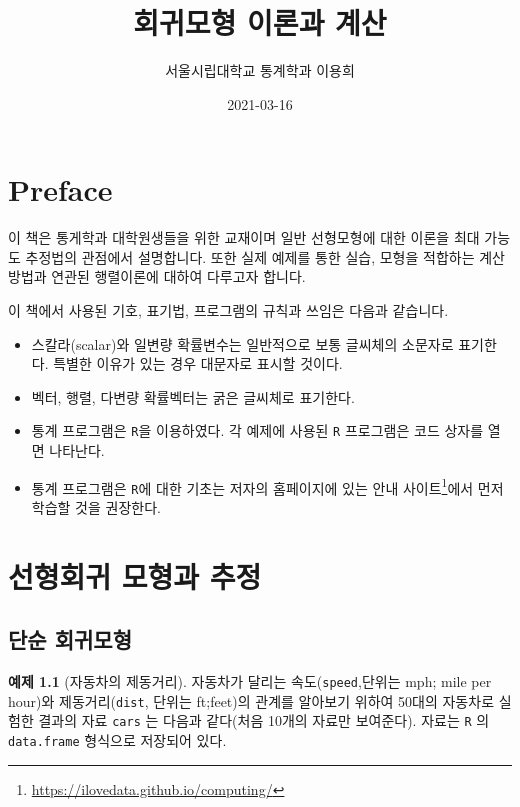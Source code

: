\documentclass[
]{book}
\title{회귀모형 이론과 계산}
\author{서울시립대학교 통계학과 이용희}
\date{2021-03-16}
\makeatletter
\providecommand{\tightlist}{%
  \setlength{\itemsep}{0pt}\setlength{\parskip}{0pt}}
\renewcommand{\href}[2]{#2\footnote{\url{#1}}}
\newenvironment{kframe}{%
\medskip{}
\setlength{\fboxsep}{.8em}
 \def\at@end@of@kframe{}%
 \ifinner\ifhmode%
  \def\at@end@of@kframe{\end{minipage}}%
  \begin{minipage}{\columnwidth}%
 \fi\fi%
 \def\FrameCommand##1{\hskip\@totalleftmargin \hskip-\fboxsep
 \colorbox{shadecolor}{##1}\hskip-\fboxsep
     \hskip-\linewidth \hskip-\@totalleftmargin \hskip\columnwidth}%
 \MakeFramed {\advance\hsize-\width
   \@totalleftmargin\z@ \linewidth\hsize
   \@setminipage}}%
 {\par\unskip\endMakeFramed%
 \at@end@of@kframe}
\newenvironment{rmdblock}[1]
  {
  \begin{itemize}
  \renewcommand{\labelitemi}{
    \raisebox{-.7\height}[0pt][0pt]{
      {\setkeys{Gin}{width=3em,keepaspectratio}\texttt{[image: images/\#1]}}
    }
  }
  \setlength{\fboxsep}{1em}
  \begin{kframe}
  \item
  }
  {
  \end{kframe}
  \end{itemize}
  }
\newenvironment{rmdimportant}
  {\begin{rmdblock}{important}}
  {\end{rmdblock}}
\theoremstyle{definition}
\theoremstyle{definition}
\newtheorem{example}{예제}[chapter]
\theoremstyle{definition}
\theoremstyle{remark}
\makeatother
\begin{document}
\maketitle

{
\setcounter{tocdepth}{1}
\tableofcontents
}
\hypertarget{preface}{%
\chapter*{Preface}\label{preface}}


이 책은 통게학과 대학원생들을 위한 교재이며 일반 선형모형에 대한 이론을 최대 가능도 추정법의 관점에서 설명합니다. 또한 실제 예제를 통한 실습, 모형을 적합하는 계산방법과 연관된 행렬이론에 대하여 다루고자 합니다.

\begin{rmdimportant}
이 책에서 사용된 기호, 표기법, 프로그램의 규칙과 쓰임은 다음과 같습니다.

\begin{itemize}
\tightlist
\item
  스칼라(scalar)와 일변량 확률변수는 일반적으로 보통 글씨체의 소문자로 표기한다. 특별한 이유가 있는 경우 대문자로 표시할 것이다.
\item
  벡터, 행렬, 다변량 확률벡터는 굵은 글씨체로 표기한다.
\item
  통계 프로그램은 \texttt{R}을 이용하였다. 각 예제에 사용된 \texttt{R} 프로그램은 코드 상자를 열면 나타난다.
\item
  통계 프로그램은 \texttt{R}에 대한 기초는 저자의 홈페이지에 있는 \href{https://ilovedata.github.io/computing/}{안내 사이트}에서 먼저 학습할 것을 권장한다.
\end{itemize}
\end{rmdimportant}

\mainmatter

\hypertarget{uxc120uxd615uxd68cuxadc0-uxbaa8uxd615uxacfc-uxcd94uxc815}{%
\chapter{선형회귀 모형과 추정}\label{uxc120uxd615uxd68cuxadc0-uxbaa8uxd615uxacfc-uxcd94uxc815}}

\hypertarget{uxb2e8uxc21c-uxd68cuxadc0uxbaa8uxd615}{%
\section{단순 회귀모형}\label{uxb2e8uxc21c-uxd68cuxadc0uxbaa8uxd615}}

\begin{example}[자동차의 제동거리]
\protect\hypertarget{exm:unnamed-chunk-4}{}{\label{exm:unnamed-chunk-4} {} }
자동차가 달리는 속도(\texttt{speed},단위는 mph; mile per hour)와 제동거리(\texttt{dist}, 단위는 ft;feet)의 관계를 알아보기 위하여 50대의 자동차로 실험한 결과의 자료 \texttt{cars} 는 다음과 같다(처음 10개의 자료만 보여준다). 자료는 \texttt{R} 의 \texttt{data.frame} 형식으로 저장되어 있다.
\end{example}
\end{document}
